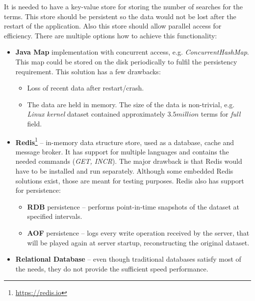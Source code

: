 It is needed to have a key-value store for storing the number of searches for the terms. This store should be persistent
so the data would not be lost after the restart of the application. Also this store should allow parallel access for
efficiency. There are multiple options how to achieve this functionality:
\begin{itemize}
    \item \textbf{Java Map} implementation with concurrent access, e.g. \textit{ConcurrentHashMap}. This map could be stored
    on the disk periodically to fulfil the persistency requirement. This solution has a few drawbacks:
    \begin{itemize}
        \item Loss of recent data after restart/crash.
        \item The data are held in memory. The size of the data is non-trivial, e.g.
        \textit{Linux kernel} dataset contained approximately $3.5 million$ terms for \textit{full} field.
    \end{itemize}

    \item \textbf{Redis}\footnote{\url{https://redis.io}} – in-memory data structure store, used as a database, cache
    and message broker. It has support for multiple languages and contains the needed commands (\textit{GET, INCR}).
    The major drawback is that Redis would have to be installed and run separately. Although some embedded Redis solutions
    exist, those are meant for testing purposes. Redis also has support for persistence:
    \begin{itemize}
        \item \textbf{RDB} persistence – performs point-in-time snapshots of the dataset at specified intervals.
        \item \textbf{AOF} persistence – logs every write operation received by the server, that will be played again
        at server startup, reconstructing the original dataset.
    \end{itemize}

    \item \textbf{Relational Database} – even though traditional databases satisfy most of the needs, they do not
    provide the sufficient speed performance.


\end{itemize}
